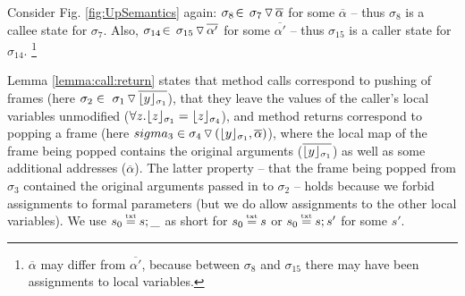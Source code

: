  

 Consider Fig. \ref{fig:UpSemantics} again: $\sigma_8\!\in\!   \PushS  {\alpha} {\sigma_7}$ for some $\overline \alpha$ -- {thus $\sigma_8$ is a callee state for 
 $\sigma_7$}. Also, 
 $\sigma_{14}\!\in\!\PushS  {\alpha'} {\sigma_{15}}$ for some $\overline {\alpha'}$ -- {thus $\sigma_{15}$ is a caller state for 
 $\sigma_{14}$}.
\footnote{ $\overline \alpha$ may differ from $\overline {\alpha'}$, because between $\sigma_8$ and $\sigma_{15}$ there may 
 have been assignments to local variables.} %
 
Lemma \ref{lemma:call:return}
states that method calls  correspond  to pushing of frames (here $\sigma_2 \in \PushS  {\interpret {\sigma_1} {y}} {\sigma_1}$),
 that they leave the values of the caller's local variables unmodified ($\forall z. \interpret {\sigma_1} {z} = \interpret {\sigma_4} {z}$), and
method returns  correspond  to popping  a frame  (here $sigma_3 \in  \PushSLong  {( {\interpret {\sigma_1} {y}},{\overline \alpha})} {\sigma_4}$), where the local map of the frame being popped contains the original arguments ($\overline {{\interpret {\sigma_1} {y}}}$) as well as some additional addresses ($\overline \alpha$).
The latter property -- that  the frame being popped from $\sigma_3$ contained the original arguments passed in to $\sigma_2$ -- holds because 
 we forbid assignments to formal parameters (but we do allow  assignments to the other local variables).
 We use $s_0\txteq s;\_$ as short for $s_0\txteq s$  or  $s_0\txteq s;s'$ for some $s'$.

